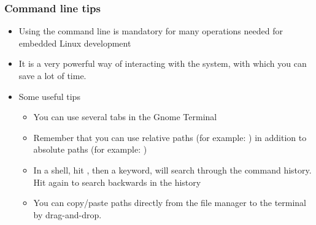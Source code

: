 \begin{frame}
  \frametitle{Command line tips}
  \begin{itemize}
  \item Using the command line is mandatory for many operations needed
    for embedded Linux development
  \item It is a very powerful way of interacting with the system, with
    which you can save a lot of time.
  \item Some useful tips
    \begin{itemize}
    \item You can use several tabs in the Gnome Terminal
    \item Remember that you can use relative paths (for example:
      ) in addition to absolute paths (for example:
      )
    \item In a shell, hit \code{[Control] [r]}, then a keyword, will
      search through the command history. Hit \code{[Control] [r]}
      again to search backwards in the history
    \item You can copy/paste paths directly from the file manager to
      the terminal by drag-and-drop.
    \end{itemize}
  \end{itemize}
\end{frame}
